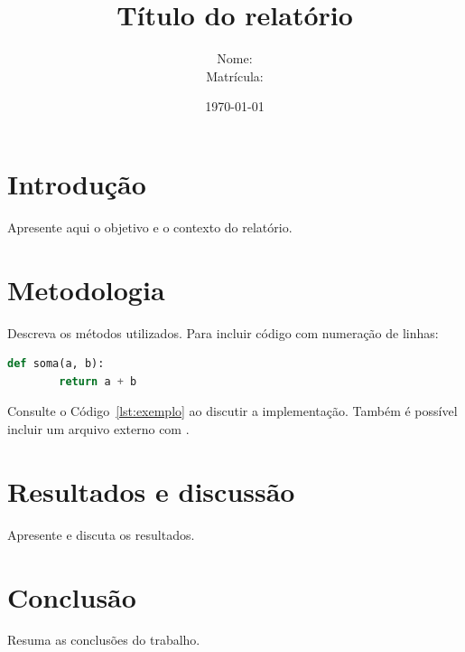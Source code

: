 \documentclass[12pt,a4paper]{article}
\title{Título do relatório}
\author{%
	\begin{tabular}{rl}
		Nome: & \rule{9cm}{0.4pt} \\
		Matrícula: & \rule{9cm}{0.4pt}
	\end{tabular}%
}
\date{\today}
\begin{document}
\maketitle

\section{Introdução}
Apresente aqui o objetivo e o contexto do relatório.

\section{Metodologia}
Descreva os métodos utilizados. Para incluir código com numeração de linhas:

\begin{lstlisting}[language=Python, caption={Exemplo de código}, label={lst:exemplo}]
def soma(a, b):
		return a + b
\end{lstlisting}

Consulte o Código~\ref{lst:exemplo} ao discutir a implementação.
Também é possível incluir um arquivo externo com
\verb||.

\section{Resultados e discussão}
Apresente e discuta os resultados.

\section{Conclusão}
Resuma as conclusões do trabalho.
\end{document}
